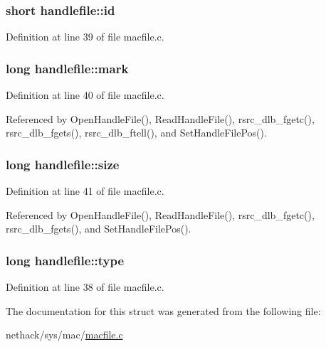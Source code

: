 \hypertarget{structhandlefile_ada05a2ea9513e0922b07222045f729d7}{
\subsubsection[{id}]{\setlength{\rightskip}{0pt plus 5cm}short handlefile\+::id}}\label{structhandlefile_ada05a2ea9513e0922b07222045f729d7}


Definition at line 39 of file macfile.\+c.

\hypertarget{structhandlefile_ae18690c2b029210d24e13f88de05e8c4}{
\subsubsection[{mark}]{\setlength{\rightskip}{0pt plus 5cm}long handlefile\+::mark}}\label{structhandlefile_ae18690c2b029210d24e13f88de05e8c4}


Definition at line 40 of file macfile.\+c.



Referenced by Open\+Handle\+File(), Read\+Handle\+File(), rsrc\+\_\+dlb\+\_\+fgetc(), rsrc\+\_\+dlb\+\_\+fgets(), rsrc\+\_\+dlb\+\_\+ftell(), and Set\+Handle\+File\+Pos().

\hypertarget{structhandlefile_ab368fa764be6648f2226c26452671a1a}{
\subsubsection[{size}]{\setlength{\rightskip}{0pt plus 5cm}long handlefile\+::size}}\label{structhandlefile_ab368fa764be6648f2226c26452671a1a}


Definition at line 41 of file macfile.\+c.



Referenced by Open\+Handle\+File(), Read\+Handle\+File(), rsrc\+\_\+dlb\+\_\+fgetc(), rsrc\+\_\+dlb\+\_\+fgets(), and Set\+Handle\+File\+Pos().

\hypertarget{structhandlefile_ad3e153e07879dc79c72298f014d63b2f}{
\subsubsection[{type}]{\setlength{\rightskip}{0pt plus 5cm}long handlefile\+::type}}\label{structhandlefile_ad3e153e07879dc79c72298f014d63b2f}


Definition at line 38 of file macfile.\+c.



The documentation for this struct was generated from the following file\+:\begin{DoxyCompactItemize}
\item 
nethack/sys/mac/\hyperlink{macfile_8c}{macfile.\+c}\end{DoxyCompactItemize}
